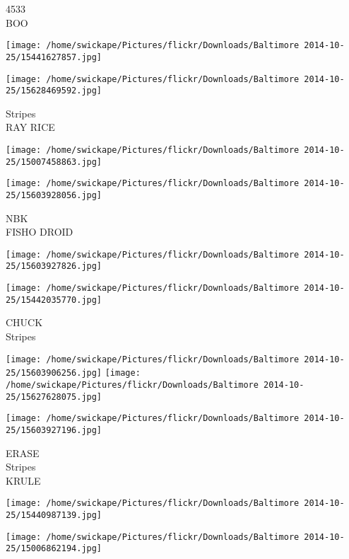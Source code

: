 \documentclass[10pt,letterpaper]{article}
\begin{document}
4533\\
BOO\\
\pagebreak

\texttt{[image: /home/swickape/Pictures/flickr/Downloads/Baltimore 2014-10-25/15441627857.jpg]}

\vspace{0.25in}
\texttt{[image: /home/swickape/Pictures/flickr/Downloads/Baltimore 2014-10-25/15628469592.jpg]}

Stripes\\
RAY RICE\\
\pagebreak

\texttt{[image: /home/swickape/Pictures/flickr/Downloads/Baltimore 2014-10-25/15007458863.jpg]}

\vspace{0.25in}
\texttt{[image: /home/swickape/Pictures/flickr/Downloads/Baltimore 2014-10-25/15603928056.jpg]}

NBK\\
FISHO DROID\\
\pagebreak

\texttt{[image: /home/swickape/Pictures/flickr/Downloads/Baltimore 2014-10-25/15603927826.jpg]}

\vspace{0.25in}
\texttt{[image: /home/swickape/Pictures/flickr/Downloads/Baltimore 2014-10-25/15442035770.jpg]}

CHUCK\\
Stripes\\
\pagebreak

\texttt{[image: /home/swickape/Pictures/flickr/Downloads/Baltimore 2014-10-25/15603906256.jpg]}
\texttt{[image: /home/swickape/Pictures/flickr/Downloads/Baltimore 2014-10-25/15627628075.jpg]}

\vspace{0.25in}
\texttt{[image: /home/swickape/Pictures/flickr/Downloads/Baltimore 2014-10-25/15603927196.jpg]}

ERASE\\
Stripes\\
KRULE\\
\pagebreak

\texttt{[image: /home/swickape/Pictures/flickr/Downloads/Baltimore 2014-10-25/15440987139.jpg]}

\vspace{0.25in}
\texttt{[image: /home/swickape/Pictures/flickr/Downloads/Baltimore 2014-10-25/15006862194.jpg]}
\end{document}
